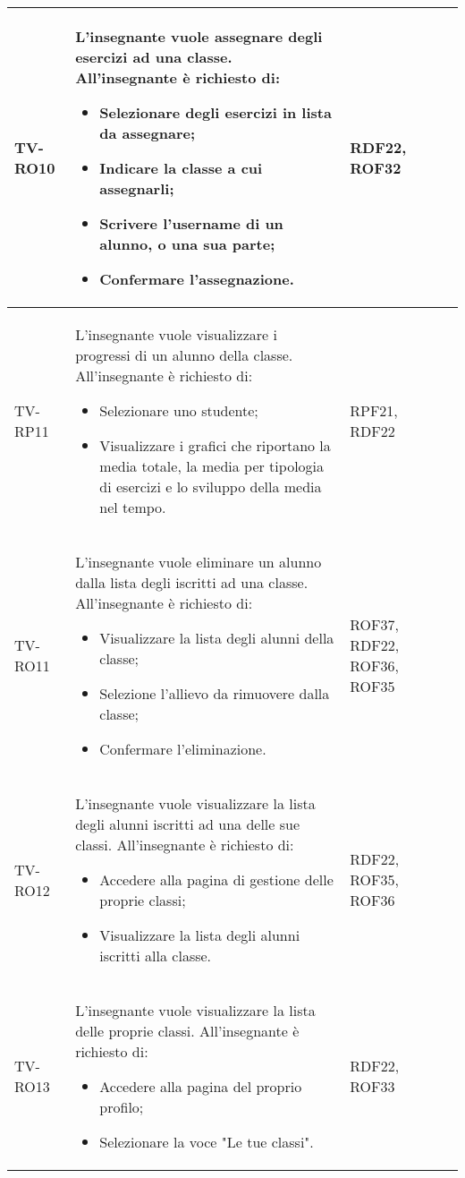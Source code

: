 \begin{longtable}{|>{\centering\arraybackslash}m{1.6cm}|>{\centering\arraybackslash}m{6.41cm}|>{\centering\arraybackslash}m{3.1cm} | >{\centering\arraybackslash}m{2.6cm}|}
		  \rowcolor{LightGray}
TV-RO10 & L'insegnante vuole assegnare degli esercizi ad una classe. All'insegnante è richiesto di:
\begin{itemize}
 \item Selezionare degli esercizi in lista da assegnare;
 \item Indicare la classe a cui assegnarli;
 \item Scrivere l'username di un alunno, o una sua parte;
 \item Confermare l'assegnazione.
\end{itemize}  & RDF22, ROF32 \\ \hline

TV-RP11 & L'insegnante vuole visualizzare i progressi di un alunno della classe. All'insegnante è richiesto di:
\begin{itemize}
 \item Selezionare uno studente;
 \item Visualizzare i grafici che riportano la media totale, la media per tipologia di
 esercizi e lo sviluppo della media nel tempo.
\end{itemize}  & RPF21, RDF22 \\ \hline
		
		  \rowcolor{LightGray}
	TV-RO11 & L'insegnante vuole eliminare un alunno dalla lista degli iscritti ad una classe. All'insegnante è richiesto di:
		\begin{itemize}
			\item Visualizzare la lista degli alunni della classe;
			\item Selezione l'allievo da rimuovere dalla classe;
			\item Confermare l'eliminazione.		
		\end{itemize}  & ROF37, RDF22, ROF36, ROF35 \\ \hline	
		
		TV-RO12 & L'insegnante vuole visualizzare la lista degli alunni iscritti ad una delle sue classi. All'insegnante è richiesto di:
		\begin{itemize}
			\item Accedere alla pagina di gestione delle proprie classi;
			\item Visualizzare la lista degli alunni iscritti alla classe.		
		\end{itemize}  & RDF22, ROF35, ROF36 \\ \hline
		
		  \rowcolor{LightGray}
		TV-RO13 & L'insegnante vuole visualizzare la lista delle proprie classi. All'insegnante è richiesto di:
		\begin{itemize}
			\item Accedere alla pagina del proprio profilo;
			\item Selezionare la voce "Le tue classi".		
		\end{itemize}  & RDF22, ROF33 \\ \hline
		

\end{longtable}

